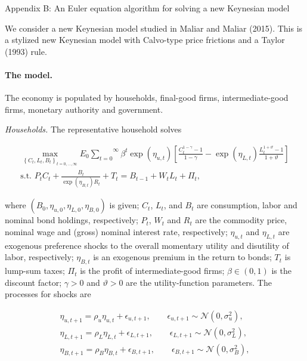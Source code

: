 \qquad \newpage

\begin{center}
\label{APNK}{\Large Appendix B: An Euler equation algorithm for solving a
new Keynesian model}
\end{center}

We consider a new Keynesian model studied in Maliar and Maliar (2015). This is
a stylized new Keynesian model with Calvo-type price frictions and a Taylor
(1993) rule.

\paragraph{The model.}

The economy is populated by households, final-good firms, intermediate-good
firms, monetary authority and government.

\textit{Households. }The representative household solves

\begin{gather}
\underset{\left \{ C_{t},L_{t},B_{t}\right \} _{t=0,...,\infty }}{\max }E_{0}
\overset{\infty }{\underset{t=0}{\sum }}\beta ^{t}\exp \left( \eta
_{u,t}\right) \left[ \frac{C_{t}^{1-\gamma }-1}{1-\gamma }-\exp \left( \eta
_{L,t}\right) \frac{L_{t}^{1+\vartheta }-1}{1+\vartheta }\right]  \label{uNK}
\\
\text{s.t. }P_{t}C_{t}+\frac{B_{t}}{\exp \left( \eta _{B,t}\right) R_{t}}
+T_{t}=B_{t-1}+W_{t}L_{t}+\Pi _{t},  \label{bcNK}
\end{gather}

where $\left( B_{0},\eta _{u,0},\eta _{L,0},\eta _{B,0}\right) $ is given; $
C_{t}$, $L_{t}$, and $B_{t}$ are consumption, labor and nominal bond holdings,
respectively; $P_{t}$, $W_{t}$ and $R_{t}$ are the commodity price, nominal
wage and (gross) nominal interest rate, respectively; $\eta _{u,t}$ and $\eta
_{L,t}$ are exogenous preference shocks to the overall momentary utility and
disutility of labor, respectively; $\eta _{B,t}$ is an exogenous premium in the
return to bonds; $T_{t}$ is lump-sum taxes; $\Pi _{t}$ is the profit of
intermediate-good firms; $\beta \in \left( 0,1\right) $ is the discount factor;
$\gamma >0$ and $\vartheta >0$ are the utility-function parameters. The
processes for shocks are

\begin{gather}
\eta _{u,t+1}=\rho _{u}\eta _{u,t}+\epsilon _{u,t+1},\qquad \epsilon
_{u,t+1}\sim \mathcal{N}\left( 0,\sigma _{u}^{2}\right) ,  \label{nuu} \\
\eta _{L,t+1}=\rho _{L}\eta _{L,t}+\epsilon _{L,t+1},\qquad \epsilon
_{L,t+1}\sim \mathcal{N}\left( 0,\sigma _{L}^{2}\right) ,  \label{nuL} \\
\eta _{B,t+1}=\rho _{B}\eta _{B,t}+\epsilon _{B,t+1},\qquad \epsilon
_{B,t+1}\sim \mathcal{N}\left( 0,\sigma _{B}^{2}\right) ,  \label{nuB}
\end{gather}

